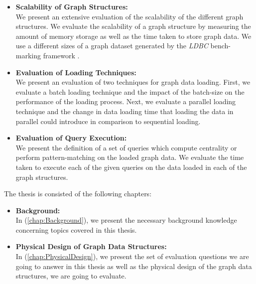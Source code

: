 {\begin{itemize}
\item \textbf{Scalability of Graph Structures:}\\
We present an extensive evaluation of the scalability of the different graph structures. We evaluate the scalability of a graph structure by measuring the amount of memory storage as well as the time taken to store graph data. We use a different sizes of a graph dataset generated by the \textit{LDBC} bench-marking framework \cite{boncz2013ldbc}.\\

\item \textbf{Evaluation of Loading Techniques:}\\
We present an evaluation of two techniques for graph data loading. First, we evaluate a batch loading technique and the impact of the batch-size on the performance of the loading process. Next, we evaluate a parallel loading technique and the change in data loading time that loading the data in parallel could introduce in comparison to sequential loading.\\

\item \textbf{Evaluation of Query Execution:}\\
We present the definition of a set of queries which compute centrality or perform pattern-matching on the loaded graph data. We evaluate the time taken to execute each of the given queries on the data loaded in each of the graph structures.

\end{itemize}



The thesis is consisted of the following chapters: 

\begin{itemize}  
\item\textbf{Background:}\\
In (\ref{chap:Background}), we present the necessary background knowledge concerning topics covered in this thesis.

\item \textbf{Physical Design of Graph Data Structures:}\\
In (\ref{chap:PhysicalDesign}), we present the set of evaluation questions we are going to answer in this thesis as well as the physical design of the graph data structures, we are going to evaluate.


\end{itemize}}
